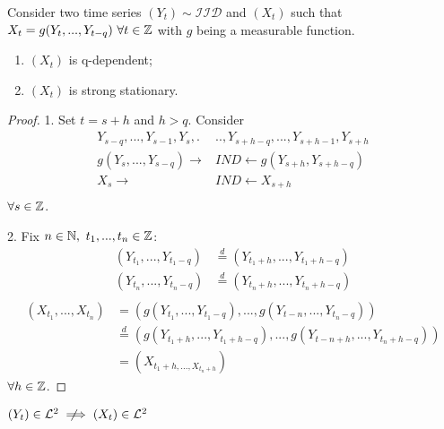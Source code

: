 \begin{proposition}
    Consider two time series $(Y_t)\sim\mathcal{IID}$ and $(X_t)$ such that $X_t=g(Y_t,...,Y_{t-q})\ \forall t\in\mathbb{Z}$ with $g$ being a measurable function.
    \begin{enumerate}
        \item $(X_t)$ is q-dependent;
        \item $(X_t)$ is strong stationary.
    \end{enumerate}
\end{proposition}
\begin{proof}
    1. Set $t=s+h$ and $h>q$. Consider
    \begin{equation*}
        \begin{split}
            Y_{s-q},...,Y_{s-1},Y_s,.&..,Y_{s+h-q},...,Y_{s+h-1},Y_{s+h}\\
            g(Y_s,...,Y_{s-q})\rightarrow&IND\leftarrow g(Y_{s+h},Y_{s+h-q})\\
            X_s\rightarrow&IND\leftarrow X_{s+h}\\
        \end{split}
    \end{equation*}
    $\forall s\in\mathbb{Z}$.
    
    2. Fix $n\in\mathbb{N},\ t_1,...,t_n\in\mathbb{Z}$:
    \begin{equation*}
        \begin{split}
            (Y_{t_1},...,Y_{t_1-q})&\stackrel{d}{=}(Y_{t_1+h},...,Y_{t_1+h-q})\\
            (Y_{t_n},...,Y_{t_n-q})&\stackrel{d}{=}(Y_{t_n+h},...,Y_{t_n+h-q})\\
        \end{split}
    \end{equation*}
    \begin{equation*}
        \begin{split}
            (X_{t_1},...,X_{t_n})&=(g(Y_{t_1},...,Y_{t_1-q}),...,g(Y_{t-n},...,Y_{t_n-q}))\\
            &\stackrel{d}{=}(g(Y_{t_1+h},...,Y_{t_1+h-q}),...,g(Y_{t-n+h},...,Y_{t_n+h-q}))\\
            &=(X_{t_1+h,...,X_{t_n+h}})
        \end{split}
    \end{equation*}
    $\forall h\in\mathbb{Z}$.
\end{proof}

\begin{remark}
    $(Y_t)\in\el{2}\notimplies(X_t)\in\el{2}$
\end{remark}

